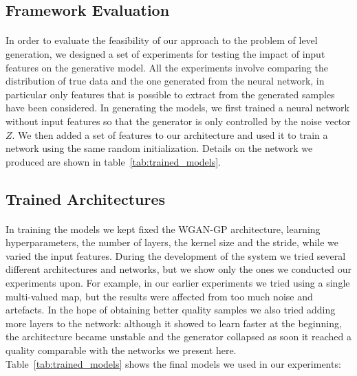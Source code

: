\subsection{Framework Evaluation}
\label{sec:modelevaluation}
\paragraph{} In order to evaluate the feasibility of our approach to the problem of level generation, we designed a set of experiments for testing the impact of input features on the generative model. 
All the experiments involve comparing the distribution of true data and the one generated from the neural network, in particular only features that is possible to extract from the generated samples have been considered. In generating the models, we first trained a neural network without input features so that the generator is only controlled by the noise vector $Z$. We then added a set of features to our architecture and used it to train a network using the same random initialization. Details on the network we produced are shown in table~\ref{tab:trained_models}.

\newpage
\subsection{Trained Architectures}
\label{sec:trainednets}
\paragraph{} In training the models we kept fixed the WGAN-GP architecture, learning hyperparameters, the number of layers, the kernel size and the stride, while we varied the input features. During the development of the system we tried several different architectures and networks, but we show only the ones we conducted our experiments upon. For example, in our earlier experiments we tried using a single multi-valued map, but the results were affected from too much noise and artefacts. In the hope of obtaining better quality samples we also tried adding more layers to the network: although it showed to learn faster at the beginning, the architecture became unstable and the generator collapsed as soon it reached a quality comparable with the networks we present here. Table~\ref{tab:trained_models} shows the final models we used in our experiments:

